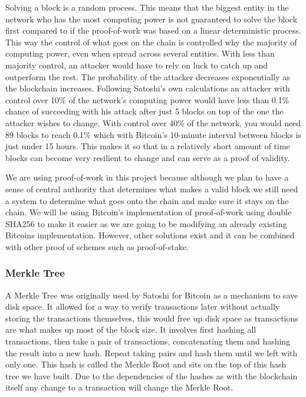 \documentclass[11pt]{article}
\begin{document}

Solving a block is a random process. This means that the biggest entity in the network who has the most computing power is not guaranteed to solve the block first compared to if the proof-of-work was based on a linear deterministic process. This way the control of what goes on the chain is controlled why the majority of computing power, even when spread across several entities. With less than majority control, an attacker would have to rely on luck to catch up and outperform the rest. The probability of the attacker decreases exponentially as the blockchain increases. Following Satoshi's own calculations\cite{nakamoto2009bitcoin} an attacker with control over 10\% of the network's computing power would have less than 0.1\% chance of succeeding with his attack after just 5 blocks on top of the one the attacker wishes to change. With control over 40\% of the network, you would need 89 blocks to reach 0.1\% which with Bitcoin's 10-minute interval between blocks is just under 15 hours. This makes it so that in a relatively short amount of time blocks can become very resilient to change and can serve as a proof of validity.

We are using proof-of-work in this project because although we plan to have a sense of central authority that determines what makes a valid block we still need a system to determine what goes onto the chain and make sure it stays on the chain. We will be using Bitcoin's implementation of proof-of-work using double SHA256 to make it easier as we are going to be modifying an already existing Bitcoins implementation. However, other solutions exist and it can be combined with other proof of schemes such as proof-of-stake.

\subsubsection{Merkle Tree}
A Merkle Tree was originally used by Satoshi for Bitcoin as a mechanism to save disk space. It allowed for a way to verify transactions later without actually storing the transactions themselves, this would free up disk space as transactions are what makes up most of the block size. It involves first hashing all transactions, then take a pair of transactions, concatenating them and hashing the result into a new hash. Repeat taking pairs and hash them until we left with only one. This hash is called the Merkle Root and sits on the top of this hash tree we have built. Due to the dependencies of the hashes as with the blockchain itself any change to a transaction will change the Merkle Root.
\end{document}
